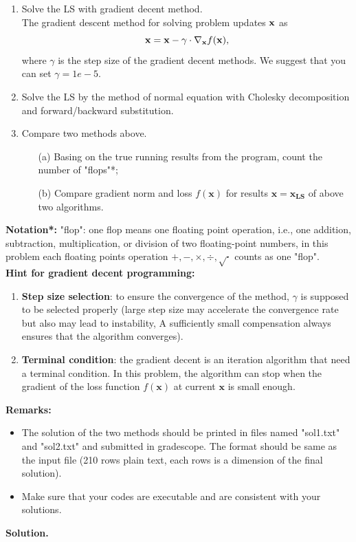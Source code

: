 \documentclass[english,onecolumn]{IEEEtran}
\begin{document}
\begin{enumerate}
    \item Solve the LS with gradient decent method.\\
    The gradient descent method for solving problem updates $ {\bf x}$ as
    $$
        {\bf x} = {\bf x} - \gamma \cdot \nabla_{{\bf x}} f(\mathbf{x}),
    $$
    where $\gamma$ is the step size of the gradient decent methods. We suggest that you can set $\gamma=1e-5$.
    \item Solve the LS by the method of normal equation with Cholesky decomposition and forward/backward substitution.
    \item Compare two methods above. 
    \begin{enumerate}
        \item[(a)] Basing on the true running results from the program, count the number of "flops"*;
        \item[(b)] Compare gradient norm and loss $f(\mathbf{x})$ for results $\mathbf{x}=\mathbf{x_{LS}}$ of above two algorithms.
    \end{enumerate}
\end{enumerate}
    \textbf{Notation*:} "flop": one flop means one floating point operation, i.e., one addition, subtraction, multiplication, or division of two floating-point numbers, in this problem each floating points operation $+,-,\times, \div, \sqrt{\cdot}$ counts as one "flop". \\
    \textbf{Hint for gradient decent programming:} 
    \begin{enumerate}
        \item \textbf{Step size selection}: to ensure the convergence of the method, $\gamma$ is supposed to be selected properly (large step size may accelerate the convergence rate but also may lead to instability, A sufficiently small compensation always ensures that the algorithm converges). 
        \item \textbf{Terminal condition}: the gradient decent is an iteration algorithm that need a terminal condition. In this problem, the algorithm can stop when the gradient of the loss function $f(\mathbf{x})$ at current $\mathbf{x}$ is small enough.
    \end{enumerate}
    \noindent\textbf{Remarks: }
   \begin{itemize}
    \item The solution of the two methods should be printed in files named "sol1.txt" and "sol2.txt" and submitted in gradescope.  The format should be same as the input file (210 rows plain text, each rows is a dimension of the final solution).
    \item Make sure that your codes are executable and are consistent with your solutions.
   \end{itemize}
\noindent
\textbf{Solution.}
\end{document}

